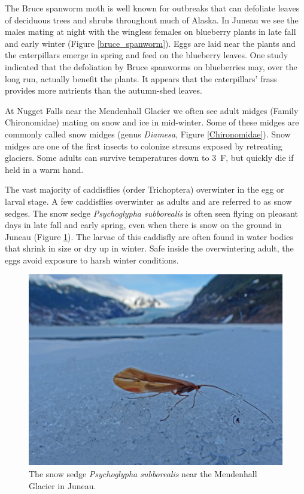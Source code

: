 \begin{multicols}{2}
The Bruce spanworm moth is well known for outbreaks that can defoliate leaves of deciduous trees and shrubs throughout much of Alaska. In Juneau we see the males mating at night with the wingless females on blueberry plants in late fall and early winter (Figure \ref{bruce_spanworm}). Eggs are laid near the plants and the caterpillars emerge in spring and feed on the blueberry leaves. One study indicated that the defoliation by Bruce spanworms on blueberries may, over the long run, actually benefit the plants. It appears that the caterpillars’ frass provides more nutrients than the autumn-shed leaves.

At Nugget Falls near the Mendenhall Glacier we often see adult midges (Family Chironomidae) mating on snow and ice in mid-winter. Some of these midges are commonly called snow midges (genus \textit{Diamesa}, Figure \ref{Chironomidae}). Snow midges are one of the first insects to colonize streams exposed by retreating glaciers. Some adults can survive temperatures down to 3~\textdegree{}F, but quickly die if held in a warm hand.

The vast majority of caddisflies (order Trichoptera) overwinter in the egg or larval stage. A few caddisflies overwinter as adults and are referred to as snow sedges. The snow sedge \textit{Psychoglypha subborealis} is often seen flying on pleasant days in late fall and early spring, even when there is snow on the ground in Juneau (Figure \ref{snow_sedge}). The larvae of this caddisfly are often found in water bodies that shrink in size or dry up in winter. Safe inside the overwintering adult, the eggs avoid exposure to harsh winter conditions. 

\begin{figure}[H]
\begin{center}
\vspace{2mm}
\includegraphics[width=\textwidth]{img/snow_sedge.jpg}
\caption{The snow sedge \textit{Psychoglypha subborealis} near the Mendenhall Glacier in Juneau.}
\label{snow_sedge}
\end{center}
\end{figure}


\end{multicols}
